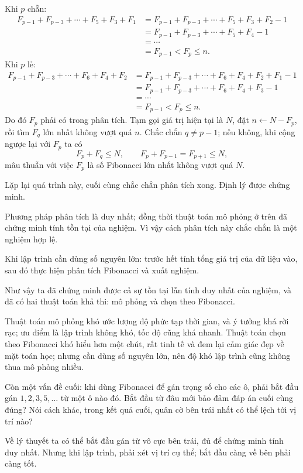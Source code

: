 \documentclass[11pt]{article}
\begin{document}
Khi \(p\) chẵn:
\[
\begin{aligned}
F_{p-1}+F_{p-3}+\cdots+F_5+F_3+F_1
&=F_{p-1}+F_{p-3}+\cdots+F_5+F_3+F_2-1\\
&=F_{p-1}+F_{p-3}+\cdots+F_5+F_4-1\\
&=\cdots\\
&=F_{p-1}<F_p\le n.
\end{aligned}
\]
Khi \(p\) lẻ:
\[
\begin{aligned}
F_{p-1}+F_{p-3}+\cdots+F_6+F_4+F_2
&=F_{p-1}+F_{p-3}+\cdots+F_6+F_4+F_2+F_1-1\\
&=F_{p-1}+F_{p-3}+\cdots+F_6+F_4+F_3-1\\
&=\cdots\\
&=F_{p-1}<F_p\le n.
\end{aligned}
\]
Do đó \(F_p\) phải có trong phân tích. Tạm gọi giá trị hiện tại là \(N\), đặt
\(n\leftarrow N-F_p\), rồi tìm \(F_q\) lớn nhất không vượt quá \(n\). Chắc
chắn \(q\ne p-1\); nếu không, khi cộng ngược lại với \(F_p\) ta có
\[
  F_p+F_q\le N,\qquad F_p+F_{p-1}=F_{p+1}\le N,
\]
mâu thuẫn với việc \(F_p\) là số Fibonacci lớn nhất không vượt quá \(N\).

Lặp lại quá trình này, cuối cùng chắc chắn phân tích xong. Định lý được chứng
minh.

Phương pháp phân tích là duy nhất; đồng thời thuật toán mô phỏng ở trên đã
chứng minh tính tồn tại của nghiệm. Vì vậy cách phân tích này chắc chắn là một
nghiệm hợp lệ.

Khi lập trình cần dùng số nguyên lớn: trước hết tính tổng giá trị của dữ liệu
vào, sau đó thực hiện phân tích Fibonacci và xuất nghiệm.

Như vậy ta đã chứng minh được cả sự tồn tại lẫn tính duy nhất của nghiệm, và
đã có hai thuật toán khả thi: mô phỏng và chọn theo Fibonacci.

Thuật toán mô phỏng khó ước lượng độ phức tạp thời gian, và ý tưởng khá rời
rạc; ưu điểm là lập trình không khó, tốc độ cũng khá nhanh. Thuật toán chọn
theo Fibonacci khó hiểu hơn một chút, rất tinh tế và đem lại cảm giác đẹp về
mặt toán học; nhưng cần dùng số nguyên lớn, nên độ khó lập trình cũng không
thua mô phỏng nhiều.

Còn một vấn đề cuối: khi dùng Fibonacci để gán trọng số cho các ô, phải bắt
đầu gán \(1,2,3,5,\ldots\) từ một ô nào đó. Bắt đầu từ đâu mới bảo đảm đáp án
cuối cùng đúng? Nói cách khác, trong kết quả cuối, quân cờ bên trái nhất có
thể lệch tới vị trí nào?

Về lý thuyết ta có thể bắt đầu gán từ vô cực bên trái, đủ để chứng minh tính
duy nhất. Nhưng khi lập trình, phải xét vị trí cụ thể; bắt đầu càng về bên
phải càng tốt.
\end{document}
